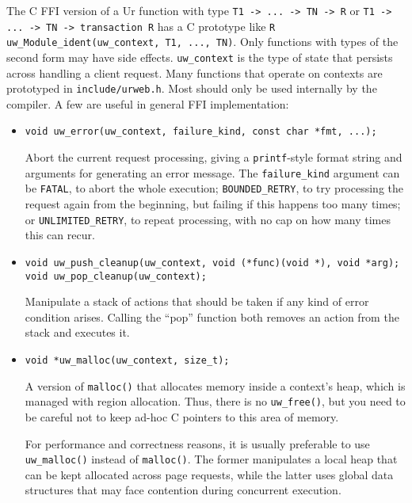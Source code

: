 \documentclass{article}
\begin{document}
The C FFI version of a Ur function with type \texttt{T1 -> ... -> TN -> R} or \texttt{T1 -> ... -> TN -> transaction R} has a C prototype like \texttt{R uw\_Module\_ident(uw\_context, T1, ..., TN)}.  Only functions with types of the second form may have side effects.  \texttt{uw\_context} is the type of state that persists across handling a client request.  Many functions that operate on contexts are prototyped in \texttt{include/urweb.h}.  Most should only be used internally by the compiler.  A few are useful in general FFI implementation:
\begin{itemize}
  \item \begin{verbatim}
void uw_error(uw_context, failure_kind, const char *fmt, ...);
  \end{verbatim}
  Abort the current request processing, giving a \texttt{printf}-style format string and arguments for generating an error message.  The \texttt{failure\_kind} argument can be \texttt{FATAL}, to abort the whole execution; \texttt{BOUNDED\_RETRY}, to try processing the request again from the beginning, but failing if this happens too many times; or \texttt{UNLIMITED\_RETRY}, to repeat processing, with no cap on how many times this can recur.

  \item \begin{verbatim}
void uw_push_cleanup(uw_context, void (*func)(void *), void *arg);
void uw_pop_cleanup(uw_context);
  \end{verbatim}
  Manipulate a stack of actions that should be taken if any kind of error condition arises.  Calling the ``pop'' function both removes an action from the stack and executes it.

  \item \begin{verbatim}
void *uw_malloc(uw_context, size_t);
  \end{verbatim}
  A version of \texttt{malloc()} that allocates memory inside a context's heap, which is managed with region allocation.  Thus, there is no \texttt{uw\_free()}, but you need to be careful not to keep ad-hoc C pointers to this area of memory.

  For performance and correctness reasons, it is usually preferable to use \texttt{uw\_malloc()} instead of \texttt{malloc()}.  The former manipulates a local heap that can be kept allocated across page requests, while the latter uses global data structures that may face contention during concurrent execution.


\end{itemize}
\end{document}
